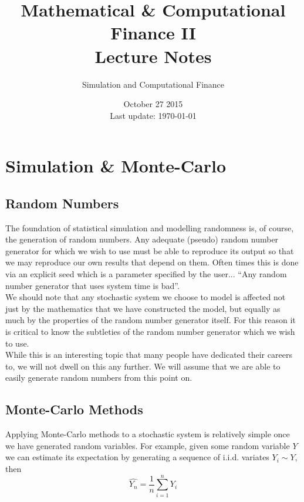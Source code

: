 \documentclass[12pt]{article}
\newlength\tindent
\renewcommand{\indent}{\hspace*{\tindent}}
\begin{document}
 
 
\title{Mathematical \& Computational Finance II\\Lecture Notes}
\author{Simulation and Computational Finance}
\date{October 27 2015 \\ Last update: \today{}}
\maketitle

\section{Simulation \& Monte-Carlo}

\subsection{Random Numbers}

\indent The foundation of statistical simulation and modelling randomness is, of course, the generation of random numbers. Any adequate (pseudo) random number generator for which we wish to use must be able to reproduce its output so that we may reproduce our own results that depend on them. Often times this is done via an explicit seed which is a parameter specified by the user... ``Any random number generator that uses system time is bad''. \\

\indent We should note that any stochastic system we choose to model is affected not just by the mathematics that we have constructed the model, but equally as much by the properties of the random number generator itself. For this reason it is critical to know the subtleties of the random number generator which we wish to use. \\

\indent While this is an interesting topic that many people have dedicated their careers to, we will not dwell on this any further. We will assume that we are able to easily generate random numbers from this point on.


\subsection{Monte-Carlo Methods}

\indent Applying Monte-Carlo methods to a stochastic system is relatively simple once we have generated random variables. For example, given some random variable $Y$ we can estimate its expectation by generating a sequence of i.i.d. variates $Y_i \sim Y$, then
\begin{equation*}
	\hat{Y_n} = \frac{1}{n}\sum^n_{i=1} Y_i
\end{equation*}
\end{document}
